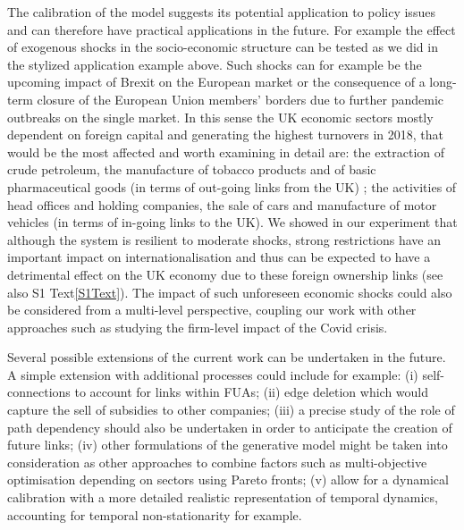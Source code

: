 \documentclass[10pt,letterpaper]{article}
\begin{document}
The calibration of the model suggests its potential application to policy issues and can therefore have practical applications in the future. For example the effect of exogenous shocks in the socio-economic structure can be tested as we did in the stylized application example above. Such shocks can for example be the upcoming impact of Brexit on the European market or the consequence of a long-term closure of the European Union members' borders due to further pandemic outbreaks on the single market. In this sense the UK economic sectors mostly dependent on foreign capital and generating the highest turnovers in 2018, that would be the most affected and worth examining in detail are: the extraction of crude petroleum, the manufacture of tobacco products and of basic pharmaceutical goods (in terms of out-going links from the UK) ; the activities of head offices and holding companies, the sale of cars and manufacture of motor vehicles (in terms of in-going links to the UK). We showed in our experiment that although the system is resilient to moderate shocks, strong restrictions have an important impact on internationalisation and thus can be expected to have a detrimental effect on the UK economy due to these foreign ownership links (see also S1 Text\ref{S1Text}). The impact of such unforeseen economic shocks could also be considered from a multi-level perspective, coupling our work with other approaches such as \cite{Dorretal2022} studying the firm-level impact of the Covid crisis.

Several possible extensions of the current work can be undertaken in the future. A simple extension with additional processes could include for example: (i) self-connections to account for links within FUAs; (ii) edge deletion which would capture the sell of subsidies to other companies; (iii) a precise study of the role of path dependency should also be undertaken in order to anticipate the creation of future links; (iv) other formulations of the generative model might be taken into consideration as other approaches to combine factors such as multi-objective optimisation depending on sectors using Pareto fronts; (v) allow for a dynamical calibration with a more detailed realistic representation of temporal dynamics, accounting for temporal non-stationarity for example.
\end{document}
